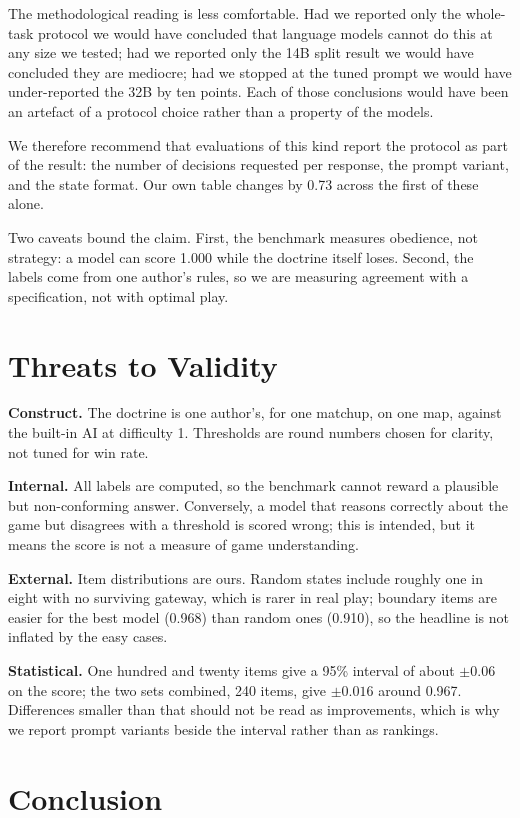 \documentclass[journal]{IEEEtran}
\begin{document}
The methodological reading is less comfortable. Had we reported only the whole-task protocol we
would have concluded that language models cannot do this at any size we tested; had we reported
only the 14B split result we would have concluded they are mediocre; had we stopped at the
tuned prompt we would have under-reported the 32B by ten points. Each of those conclusions
would have been an artefact of a protocol choice rather than a property of the models.

We therefore recommend that evaluations of this kind report the protocol as part of the result:
the number of decisions requested per response, the prompt variant, and the state format. Our
own table changes by 0.73 across the first of these alone.

Two caveats bound the claim. First, the benchmark measures obedience, not strategy: a model can
score 1.000 while the doctrine itself loses. Second, the labels come from one author's rules,
so we are measuring agreement with a specification, not with optimal play.

\section{Threats to Validity}

\textbf{Construct.} The doctrine is one author's, for one matchup, on one map, against the
built-in AI at difficulty 1. Thresholds are round numbers chosen for clarity, not tuned for
win rate.

\textbf{Internal.} All labels are computed, so the benchmark cannot reward a plausible but
non-conforming answer. Conversely, a model that reasons correctly about the game but disagrees
with a threshold is scored wrong; this is intended, but it means the score is not a measure of
game understanding.

\textbf{External.} Item distributions are ours. Random states include roughly one in eight with
no surviving gateway, which is rarer in real play; boundary items are easier for the best model
(0.968) than random ones (0.910), so the headline is not inflated by the easy cases.

\textbf{Statistical.} One hundred and twenty items give a 95\% interval of about $\pm 0.06$ on
the score; the two sets combined, 240 items, give $\pm 0.016$ around 0.967. Differences smaller
than that should not be read as improvements, which is why we report prompt variants beside the
interval rather than as rankings.

\section{Conclusion}
\end{document}
